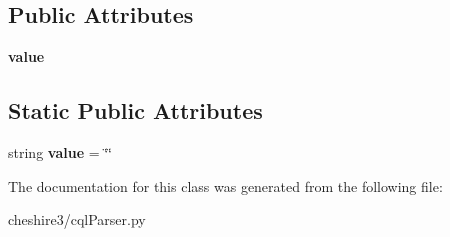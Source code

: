 \subsection*{Public Attributes}
\begin{DoxyCompactItemize}
\item 
\hypertarget{classcheshire3_1_1cql_parser_1_1_term_aebfdc6910033c0f26c28b091758ac85d}{{\bfseries value}}\label{classcheshire3_1_1cql_parser_1_1_term_aebfdc6910033c0f26c28b091758ac85d}

\end{DoxyCompactItemize}
\subsection*{Static Public Attributes}
\begin{DoxyCompactItemize}
\item 
\hypertarget{classcheshire3_1_1cql_parser_1_1_term_aebb1a9863b372e8c6b0ce56b1a06e858}{string {\bfseries value} = \char`\"{}\char`\"{}}\label{classcheshire3_1_1cql_parser_1_1_term_aebb1a9863b372e8c6b0ce56b1a06e858}

\end{DoxyCompactItemize}


The documentation for this class was generated from the following file\-:\begin{DoxyCompactItemize}
\item 
cheshire3/cql\-Parser.\-py\end{DoxyCompactItemize}
